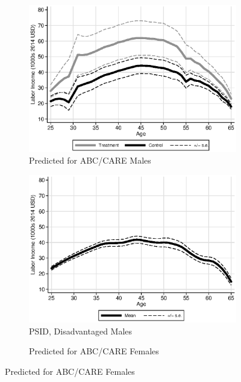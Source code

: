 \begin{figure}
\centering
\caption{Labor Income Profiles, Prediction Based on $X,W,Z$}\label{fig:labor-income-profiles}
\begin{subfigure}[h]{0.4\textwidth}
		\centering
		\caption{Predicted for ABC/CARE Males} \label{fig:abcare1}
		\includegraphics[width=\textwidth]{output/labor_25-60_male_2.eps}
\end{subfigure}%
\begin{subfigure}[h]{0.4\textwidth}
	\centering
	\caption{PSID, Disadvantaged Males} \label{fig:psid1}
		\includegraphics[width=\textwidth]{output/psid_incomeprofiles_s1.eps}
\end{subfigure}
\begin{subfigure}[h]{0.4\textwidth}
		\centering
		\caption{Predicted for ABC/CARE Females} \label{fig:abcare0}

\end{subfigure}
\end{figure}

